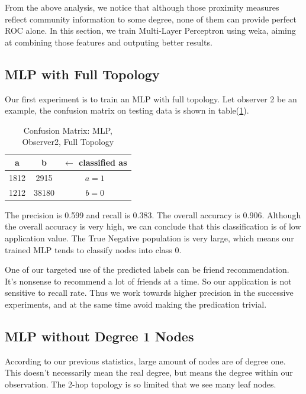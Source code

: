 \documentclass[11pt,a4paper]{article}
\begin{document}
From the above analysis, we notice that although those 
proximity measures reflect community information to some degree, 
none of them can provide perfect ROC alone. In this section, 
we train Multi-Layer Perceptron using weka\cite{weka}, aiming at
combining those features and outputing better results. 

\subsection{MLP with Full Topology}

Our first experiment is to train an MLP with full topology. 
Let observer 2 be an example, the confusion matrix on testing 
data is shown in table(\ref{tbl:cm_o2_full}). 

\begin{table}[htb]
	\centering
	\caption{Confusion Matrix: MLP, Observer2, Full Topology}
	\label{tbl:cm_o2_full}
	\begin{tabular}{cc|c}
	\hline
a & b & \textbf{$\leftarrow$ classified as}\\	
	\hline
1812 &  2915 &    $a = 1$ \\
1212 & 38180 &    $b = 0$\\
	\hline
	\end{tabular}
\end{table}

The precision is 0.599 and recall is 0.383. The overall accuracy 
is 0.906. Although the overall accuracy is very high, we can 
conclude that this classification is of low application value. 
The True Negative population is very large, which means our trained 
MLP tends to classify nodes into class 0. 

One of our targeted use of the predicted labels can be friend 
recommendation. It's nonsense to recommend a lot of friends 
at a time. So our application is not sensitive to recall rate. 
Thus we work towards higher precision in the successive experiments, 
and at the same time avoid making the predication trivial. 

\subsection{MLP without Degree 1 Nodes}

According to our previous statistics, large amount of nodes
are of degree one. This doesn't necessarily mean the real 
degree, but means the degree within our observation. 
The 2-hop topology is so limited that we see many leaf nodes. 
\end{document}
